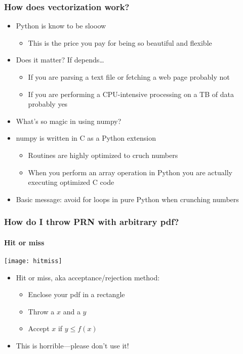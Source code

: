\documentclass[9pt]{beamer}
\begin{document}
\begin{frame}
  \frametitle{How does vectorization work?}
  \begin{itemize}
  \item Python is know to be slooow
    \begin{itemize}
    \item This is the price you pay for being so beautiful and flexible
    \end{itemize}
  \item Does it matter? If depends\ldots
    \begin{itemize}
    \item If you are parsing a text file or fetching a web page probably not
    \item If you are performing a CPU-intensive processing on a TB of data
      probably yes
    \end{itemize}
  \item What's so magic in using numpy?
  \item numpy is written in C as a Python extension
    \begin{itemize}
    \item Routines are highly optimized to cruch numbers
    \item When you perform an array operation in Python you are actually
      executing optimized C code
    \end{itemize}
  \item \alert{Basic message: avoid for loops in pure Python when
    crunching numbers}
  \end{itemize}
\end{frame}


\begin{frame}
  \frametitle{How do I throw PRN with arbitrary pdf?}
  \framesubtitle{Hit or miss}
  \centering\texttt{[image: hitmiss]}

  \begin{itemize}
  \item Hit or miss, aka acceptance/rejection method:
    \begin{itemize}
    \item Enclose your pdf in a rectangle
    \item Throw a $x$ and a $y$
    \item Accept $x$ if $y \leq f(x)$
    \end{itemize}
  \item \alert{This is horrible---please don't use it!}
  \end{itemize}
\end{frame}
\end{document}
